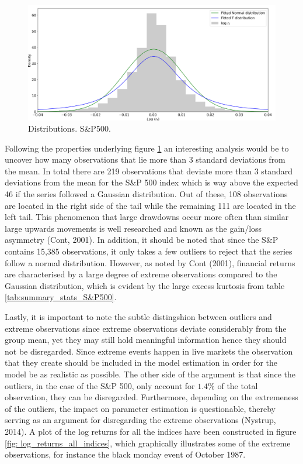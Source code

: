\begin{figure}[H] 
    \centering
    \includegraphics[width=1\textwidth]{analysis/data_description/images/SP500_distribution.png}
    \caption{Distributions. S\&P500.}
    \label{fig: Kernel_distributions}
\end{figure}

Following the properties underlying figure \ref{fig: Kernel_distributions} an interesting analysis would be to uncover how many observations that lie more than 3 standard deviations from the mean. In total there are 219 observations that deviate more than 3 standard deviations from the mean for the S\&P 500 index which is way above the expected 46 if the series followed a Gaussian distribution. Out of these, 108 observations are located in the right side of the tail while the remaining 111 are located in the left tail. This phenomenon that large drawdowns occur more often than similar large upwards movements is well researched and known as the gain/loss asymmetry (Cont, 2001). In addition, it should be noted that since the S\&P contains 15,385 observations, it only takes a few outliers to reject that the series follow a normal distribution. However, as noted by Cont (2001), financial returns are characterised by a large degree of extreme observations compared to the Gaussian distribution, which is evident by the large excess kurtosis from table \ref{tab:summary_stats_S&P500}.

Lastly, it is important to note the subtle distingshion between outliers and extreme observations since extreme observations deviate considerably from the group mean, yet they may still hold meaningful information hence they should not be disregarded.
Since extreme events happen in live markets the observation that they create should be included in the model estimation in order for the model be as realistic as possible. The other side of the argument is that since the outliers, in the case of the S\&P 500, only account for $1.4\%$ of the total observation, they can be disregarded. Furthermore, depending on the extremeness of the outliers, the impact on parameter estimation is questionable, thereby serving as an argument for disregarding the extreme observations (Nystrup, 2014). A plot of the log returns for all the indices have been constructed in figure \ref{fig: log_returns_all_indices}, which graphically illustrates some of the extreme observations, for instance the black monday event of October 1987.

